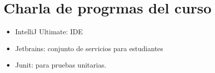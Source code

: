 \section{Charla de progrmas del curso}
\begin{itemize}
    \item IntelliJ Ultimate: IDE 
    \item Jetbrains: conjunto de servicios para estudiantes
    \item Junit: para pruebas unitarias.
\end{itemize}
